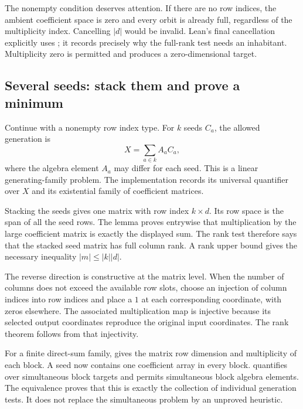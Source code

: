 
The nonempty condition deserves attention. If there are no row indices, the ambient coefficient space is zero and every orbit is already full, regardless of the multiplicity index. Cancelling $|d|$ would be invalid. Lean's final cancellation explicitly uses ; it records precisely why the full-rank test needs an inhabitant. Multiplicity zero is permitted and produces a zero-dimensional target.

\subsection{Several seeds: stack them and prove a minimum}
Continue with a nonempty row index type. For $k$ seeds $C_a$, the allowed generation is
\[
X=\sum_{a\in k}A_aC_a,
\]
where the algebra element $A_a$ may differ for each seed. This is a linear generating-family problem. The implementation records its universal quantifier over $X$ and its existential family of coefficient matrices.


Stacking the seeds gives one matrix with row index $k\times d$. Its row space is the span of all the seed rows. The lemma  proves entrywise that multiplication by the large coefficient matrix is exactly the displayed sum. The rank test therefore says that the stacked seed matrix has full column rank. A rank upper bound gives the necessary inequality $|m|\le |k||d|$.

The reverse direction is constructive at the matrix level. When the number of columns does not exceed the available row slots, choose an injection of column indices into row indices and place a $1$ at each corresponding coordinate, with zeros elsewhere. The associated multiplication map is injective because its selected output coordinates reproduce the original input coordinates. The rank theorem follows from that injectivity.


For a finite direct-sum family,  gives the matrix row dimension and multiplicity of each block. A seed now contains one coefficient array in every block.  quantifies over simultaneous block targets and permits simultaneous block algebra elements. The equivalence  proves that this is exactly the collection of individual generation tests. It does not replace the simultaneous problem by an unproved heuristic.

